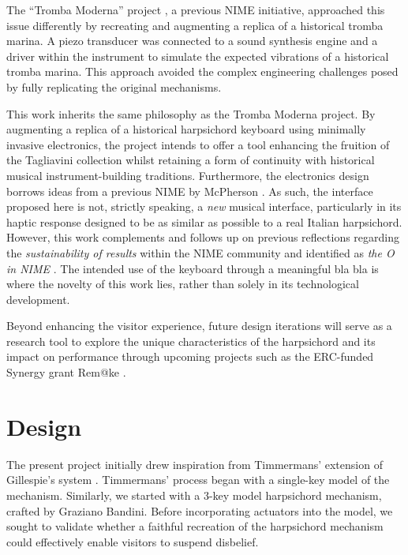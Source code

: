 The ``Tromba Moderna'' project \cite{Baldwin2016}, a previous NIME initiative, approached this issue differently by recreating and augmenting a replica of a historical tromba marina. A piezo transducer was connected to a sound synthesis engine and a driver within the instrument to simulate the expected vibrations of a historical tromba marina. This approach avoided the complex engineering challenges posed by fully replicating the original mechanisms.

This work inherits the same philosophy as the Tromba Moderna project. By augmenting a replica of a historical harpsichord keyboard using minimally invasive electronics, the project intends to offer a tool enhancing the fruition of the Tagliavini collection whilst retaining a form of continuity with historical musical instrument-building traditions. Furthermore, the electronics design borrows ideas from a previous NIME by McPherson \cite{McPherson2013}. As such, the interface proposed here is not, strictly speaking, a \emph{new} musical interface, particularly in its haptic response designed to be as similar as possible to a real Italian harpsichord. However, this work complements and follows up on previous reflections regarding the \emph{sustainability of results} within the NIME community and identified as \emph{the O in NIME} \cite{Masu_NIME_2023}. The intended use of the keyboard through a meaningful bla bla is where the novelty of this work lies, rather than solely in its technological development. 

Beyond enhancing the visitor experience, future design iterations will serve as a research tool to explore the unique characteristics of the harpsichord and its impact on performance through upcoming projects such as the ERC-funded Synergy grant Rem@ke \cite{remake1}.

\section{Design}\label{design}

The present project initially drew inspiration from Timmermans' extension of Gillespie’s system \cite{Timmermans2020, Gillespie1996}. Timmermans’ process began with a single-key model of the mechanism. Similarly, we started with a 3-key model harpsichord mechanism, crafted by Graziano Bandini. Before incorporating actuators into the model, we sought to validate whether a faithful recreation of the harpsichord mechanism could effectively enable visitors to suspend disbelief.

